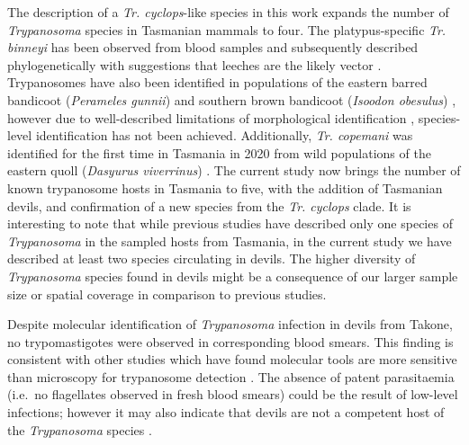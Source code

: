 \documentclass[a4paper, nobind]{templates/ociamthesis}
\begin{document}
The description of a \emph{Tr. cyclops}-like species in this work expands the number of \emph{Trypanosoma} species in Tasmanian mammals to four. The platypus-specific \emph{Tr. binneyi} has been observed from blood samples and subsequently described phylogenetically \autocite{mackerrasHaematozoaAustralianMammals1959,jakesPhylogeneticRelationshipsTrypanosoma2001,papariniNovelGenotypesTrypanosoma2014} with suggestions that leeches are the likely vector \autocite{papariniNovelGenotypesTrypanosoma2014}. Trypanosomes have also been identified in populations of the eastern barred bandicoot (\emph{Perameles gunnii}) and southern brown bandicoot (\emph{Isoodon obesulus}) \autocite{bettiolFirstRecordTrypanosomes1998}, however due to well-described limitations of morphological identification \autocite{lukesEvolutionParasitismKinetoplastid2014}, species-level identification has not been achieved. Additionally, \emph{Tr. copemani} was identified for the first time in Tasmania in 2020 from wild populations of the eastern quoll (\emph{Dasyurus viverrinus}) \autocite{portasBaselineHealthDisease2020}. The current study now brings the number of known trypanosome hosts in Tasmania to five, with the addition of Tasmanian devils, and confirmation of a new species from the \emph{Tr. cyclops} clade. It is interesting to note that while previous studies have described only one species of \emph{Trypanosoma} in the sampled hosts from Tasmania, in the current study we have described at least two species circulating in devils. The higher diversity of \emph{Trypanosoma} species found in devils might be a consequence of our larger sample size or spatial coverage in comparison to previous studies.

Despite molecular identification of \emph{Trypanosoma} infection in devils from Takone, no trypomastigotes were observed in corresponding blood smears. This finding is consistent with other studies which have found molecular tools are more sensitive than microscopy for trypanosome detection \autocite{paguemWidespreadCoendemicityTrypanosoma2019,rodriguesUncoveringTrypanosomaSpp2019}. The absence of patent parasitaemia (i.e.~no flagellates observed in fresh blood smears) could be the result of low-level infections; however it may also indicate that devils are not a competent host of the \emph{Trypanosoma} species \autocite{brandaoTrypanosomatidsSmallMammals2019}.
\end{document}
